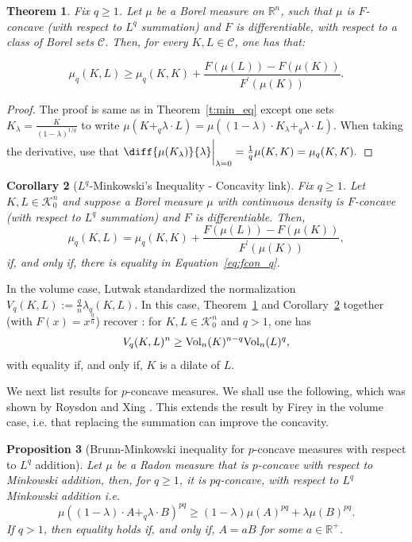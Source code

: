\documentclass[11pt]{amsart}
\newtheorem{theorem}{Theorem}[section]
\newtheorem{corollary}[theorem]{Corollary}
\newtheorem{proposition}[theorem]{Proposition}
\theoremstyle{definition}
\theoremstyle{remark}
\numberwithin{equation}{section}
\newcommand{\R}{\mathbb{R}}
\newcommand{\conbod}{\mathcal{K}^n}
\newcommand{\vol}{\text{\rm Vol}}
\begin{document}
\begin{theorem}
\label{t:LqFcon}
Fix $q\geq 1$. Let $\mu$ be a Borel measure on $\R^{n}$, such that $\mu$ is $F$-concave (with respect to $L^q$ summation) and $F$ is differentiable, with respect to a class of Borel sets $\mathcal{C}$. Then, for every $K,L\in\mathcal{C}$, one has that:

$$
\mu_q(K, L) \geq \mu_q(K, K)+\frac{F(\mu(L))-F(\mu(K))}{F^{\prime}(\mu(K))}.
$$
\end{theorem}
\begin{proof}
The proof is same as in Theorem~\ref{t:min_eq} except one sets $K_\lambda=\frac{K}{(1-\lambda)^{1/q}}$ to write $\mu(K+_q\lambda\cdot L)=\mu((1-\lambda)\cdot K_\lambda+_q\lambda \cdot L)$. When taking the derivative, use that $\diff{\mu(K_\lambda)}{\lambda}\bigg|_{\lambda=0}=\frac{1}{q}\mu(K,K)=\mu_q(K,K).$
\end{proof}
	\begin{corollary}[$L^q$-Minkowski's Inequality - Concavity link]
\label{cor:minkowski_q}
Fix $q\geq 1$. Let $K,L\in\conbod_0$ and suppose a Borel measure $\mu$ with continuous density is $F$-concave (with respect to $L^q$ summation) and $F$ is differentiable. Then, $$
\mu_q(K, L) = \mu_q(K, K)+\frac{F(\mu(L))-F(\mu(K))}{F^{\prime}(\mu(K))},
$$
if, and only if, there is equality in Equation~\ref{eq:fcon_q}.
\end{corollary}
\noindent In the volume case, Lutwak \cite{LE93} standardized the normalization $V_q(K,L):=\frac{q}{n}\lambda_q(K,L)$. In this case, Theorem~\ref{t:LqFcon} and Corollary~\ref{cor:minkowski_q} together (with $F(x)=x^\frac{q}{n}$) recover \cite[Theorem 1.2]{LE93}: for $K,L\in\conbod_0$ and $q>1$, one has
$$V_q(K,L)^n \geq \vol_n(K)^{n-q}\vol_n(L)^q,$$
with equality if, and only if, $K$ is a dilate of $L$.

We next list results for $p$-concave measures. We shall use the following, which was shown by Roysdon and Xing \cite{RX21}. This extends the result by Firey in the volume case, i.e. that replacing the summation can improve the concavity.
\begin{proposition}[Brunn-Minkowski inequality for $p$-concave measures with respect to $L^q$ addition]
\label{p:RX}
Let $\mu$ be a Radon measure that is $p$-concave with respect to Minkowski addition, then, for $q\geq 1$, it is $pq$-concave, with respect to $L^q$ Minkowski addition i.e.
\begin{equation}
    \label{eq:pq_concave}
    \mu\left((1-\lambda) \cdot A+_q \lambda \cdot B\right)^{pq} \geq (1-\lambda) \mu(A)^{pq}+\lambda \mu(B)^{pq}.
\end{equation}
If $q>1$, then equality holds if, and only if, $A=aB$ for some $a\in\R^+$.
\end{proposition}
\end{document}
